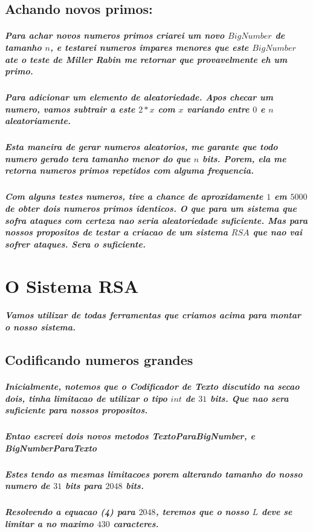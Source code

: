 \documentclass[12pt,twoside, a4paper, twocolumn]{article}
\begin{document}
\subsection{Achando novos primos:}

\subparagraph*{Para achar novos numeros primos criarei um novo $BigNumber$ de tamanho $n$, e testarei numeros impares menores que este $BigNumber$ ate o teste de Miller Rabin me retornar que provavelmente eh um primo.}

\subparagraph*{Para adicionar um elemento de aleatoriedade. Apos checar um numero, vamos subtrair a este $2*x$ com $x$ variando entre $0$ e $n$ aleatoriamente.}

\subparagraph*{Esta maneira de gerar numeros aleatorios, me garante que todo numero gerado tera tamanho menor do que $n$ bits. Porem, ela me retorna numeros primos repetidos com alguma frequencia.}

\subparagraph*{Com alguns testes numeros, tive a chance de aproxidamente $1$ em $5000$ de obter dois numeros primos identicos. O que para um sistema que sofra ataques com certeza nao seria aleatoriedade suficiente. Mas para nossos propositos de testar a criacao de um sistema $RSA$ que nao vai sofrer ataques. Sera o suficiente.}

\section{O Sistema RSA}

\subparagraph*{Vamos utilizar de todas ferramentas que criamos acima para montar o nosso sistema.}

\subsection{Codificando numeros grandes}

\subparagraph*{Inicialmente, notemos que o \emph{Codificador de Texto} discutido na secao dois, tinha limitacao de utilizar o tipo $int$ de $31$ bits. Que nao sera suficiente para nossos propositos. }

\subparagraph*{Entao escrevi dois novos metodos \emph{TextoParaBigNumber}, e \emph{BigNumberParaTexto} }

\subparagraph*{Estes tendo as mesmas limitacoes porem alterando tamanho do nosso numero de $31$ bits para $2048$ bits.}

\subparagraph*{Resolvendo a equacao (4) para $2048$, teremos que o nosso $L$ deve se limitar a no maximo $430$ caracteres.}
\end{document}

